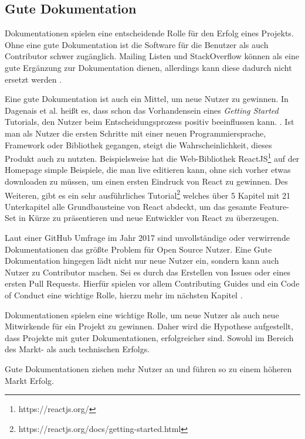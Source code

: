 \subsection{Gute Dokumentation}

Dokumentationen spielen eine entscheidende Rolle für den Erfolg eines Projekts.
Ohne eine gute Dokumentation ist die Software für die Benutzer als auch Contributor schwer zugänglich. 
Mailing Listen und StackOverflow können als eine gute Ergänzung zur Dokumentation dienen, allerdings kann
diese dadurch nicht ersetzt werden \cite{bangerthWhatMakesComputational2013}. %

Eine gute Dokumentation ist auch ein Mittel, um neue Nutzer zu gewinnen. In Dagenais et al. heißt es,
dass schon das Vorhandensein eines \textit{Getting Started} Tutorials, den Nutzer beim 
Entscheidungsprozess positiv beeinflussen kann. \cite{dagenaisDeveloperDocumentation}. %
Ist man als Nutzer die ersten Schritte mit einer neuen Programmiersprache, Framework oder Bibliothek
gegangen, steigt die Wahrscheinlichkeit, dieses Produkt auch zu nutzten.
Beispielsweise hat die Web-Bibliothek ReactJS\footnote{https://reactjs.org/} auf der Homepage simple 
Beispiele, die man live editieren kann, ohne sich vorher etwas downloaden zu müssen, um einen
ersten Eindruck von React zu gewinnen.
Des Weiteren, gibt es ein sehr ausführliches Tutorial\footnote{https://reactjs.org/docs/getting-started.html}
welches über 5 Kapitel mit 21 Unterkapitel alle Grundbausteine von React abdeckt, um das gesamte 
Feature-Set in Kürze zu präsentieren und neue Entwickler von React zu überzeugen.

Laut einer GitHub Umfrage im Jahr 2017 sind unvollständige oder verwirrende Dokumentationen das größte
Problem für Open Source Nutzer. Eine Gute Dokumentation hingegen lädt nicht nur neue Nutzer ein,
sondern kann auch Nutzer zu Contributor machen.
Sei es durch das Erstellen von Issues oder eines ersten Pull Requests.
Hierfür spielen vor allem Contributing Guides und ein Code of Conduct eine wichtige Rolle, hierzu
mehr im nächsten Kapitel \cite{GitHubOpenSourceSurvey2017}.

Dokumentationen spielen eine wichtige Rolle, um neue Nutzer als auch neue Mitwirkende für ein
Projekt zu gewinnen. 
Daher wird die Hypothese aufgestellt, dass Projekte mit guter Dokumentationen, erfolgreicher sind.
Sowohl im Bereich des Markt- als auch technischen Erfolgs.


\begin{hypothesis}
    Gute Dokumentationen ziehen mehr Nutzer an und führen so zu einem höheren Markt Erfolg.
\end{hypothesis}